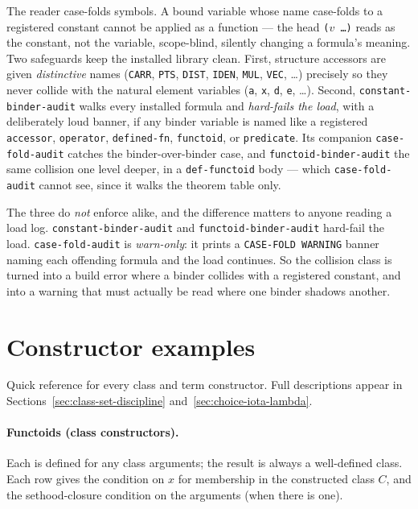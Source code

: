 \begin{remark}
\label{rem:case-fold}
The reader case-folds symbols.  A bound variable whose name case-folds
to a registered constant cannot be applied as a function --- the head
\texttt{($v$ \ldots)} reads as the constant, not the variable, scope-blind,
silently changing a formula's meaning.  Two safeguards keep the installed
library clean.  First, structure accessors are given \emph{distinctive}
names (\texttt{CARR}, \texttt{PTS}, \texttt{DIST}, \texttt{IDEN}, \texttt{MUL},
\texttt{VEC}, \ldots) precisely so they never collide with the natural
element variables (\texttt{a}, \texttt{x}, \texttt{d}, \texttt{e}, \ldots).
Second, \texttt{constant-binder-audit} walks every installed formula and
\emph{hard-fails the load}, with a deliberately loud banner, if any binder
variable is named like a registered \texttt{accessor}, \texttt{operator},
\texttt{defined-fn}, \texttt{functoid}, or \texttt{predicate}.  Its companion
\texttt{case-fold-audit} catches the binder-over-binder case, and
\texttt{functoid-binder-audit} the same collision one level deeper, in a
\texttt{def-functoid} body --- which \texttt{case-fold-audit} cannot see, since
it walks the theorem table only.

The three do \emph{not} enforce alike, and the difference matters to anyone
reading a load log.  \texttt{constant-binder-audit} and
\texttt{functoid-binder-audit} hard-fail the load.  \texttt{case-fold-audit} is
\emph{warn-only}: it prints a \texttt{CASE-FOLD WARNING} banner naming each
offending formula and the load continues.  So the collision class is turned into
a build error where a binder collides with a registered constant, and into a
warning that must actually be read where one binder shadows another.
\end{remark}

\section{Constructor examples}
\label{sec:constructor-examples}

Quick reference for every class and term constructor.  Full descriptions
appear in Sections~\ref{sec:class-set-discipline}
and~\ref{sec:choice-iota-lambda}.

\paragraph{Functoids (class constructors).}  Each is defined for any class
arguments; the result is always a well-defined class.  Each row gives the
condition on $x$ for membership in the constructed class $C$, and the
sethood-closure condition on the arguments (when there is one).

